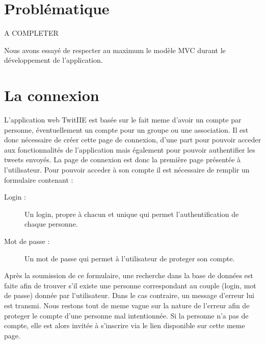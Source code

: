 \documentclass[a4paper, 12pt]{article}
\begin{document}
\newpage
\section{Problématique}	
	\large{A COMPLETER}

Nous avons essayé de respecter au maximum le modèle MVC durant le développement de l'application.

\section{La connexion}	
L'application web TwitIIE est basée sur le fait meme d'avoir un compte par personne, éventuellement un compte pour un groupe ou une association. Il est donc nécessaire de créer cette page de connexion, d'une part pour pouvoir acceder aux fonctionnalités de l'application mais également pour pouvoir authentifier les tweets envoyés.
La page de connexion est donc la première page présentée à l'utilisateur. Pour pouvoir acceder à son compte il est nécessaire de remplir un formulaire contenant : 
\begin{description}
\item[Login :] Un login, propre à chacun et unique qui permet l'authentification de chaque personne.
\item[Mot de passe :] Un mot de passe qui permet à l'utilisateur de proteger son compte.
\end{description}
Après la soumission de ce formulaire, une recherche dans la base de données est faite afin de trouver s'il existe une personne correspondant au couple (login, mot de passe) donnée par l'utilisateur.
Dans le cas contraire, un message d'erreur lui est transmi. Nous restons tout de meme vague sur la nature de l'erreur afin de proteger le compte d'une personne mal intentionnée.
Si la personne n'a pas de compte, elle est alors invitée à s'inscrire via le lien disponible sur cette meme page. 
\end{document}
